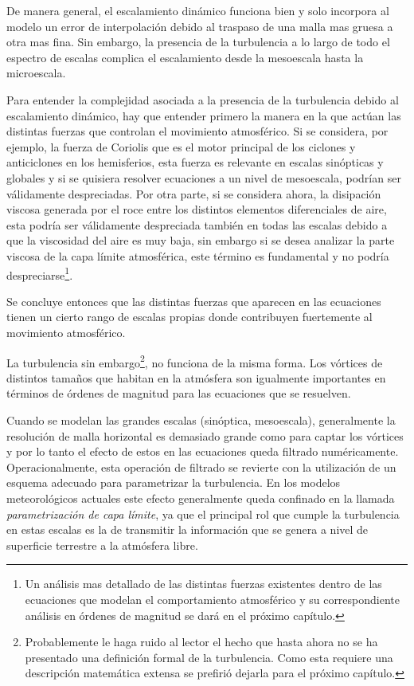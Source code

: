 De manera general, el escalamiento dinámico funciona bien y solo incorpora al modelo un error de interpolación debido al traspaso de una malla mas gruesa a otra mas fina. Sin embargo, la presencia de la turbulencia a lo largo de todo el espectro de escalas complica el escalamiento desde la mesoescala hasta la microescala.

Para entender la complejidad asociada a la presencia de la turbulencia debido al escalamiento dinámico, hay que entender primero la manera en la que actúan las distintas fuerzas que controlan el movimiento atmosférico. Si se considera, por ejemplo, la fuerza de Coriolis que es el motor principal de los ciclones y anticiclones en los hemisferios, esta fuerza es relevante en escalas sinópticas y globales y si se quisiera resolver ecuaciones a un nivel de mesoescala, podrían ser válidamente despreciadas. Por otra parte, si se considera ahora, la disipación viscosa generada por el roce entre los distintos elementos diferenciales de aire, esta podría ser válidamente despreciada también en todas las escalas debido a que la viscosidad del aire es muy baja, sin embargo si se desea analizar la parte viscosa de la capa límite atmosférica, este término es fundamental y no podría despreciarse\footnote{Un análisis mas detallado de las distintas fuerzas existentes dentro de las ecuaciones que modelan el comportamiento atmosférico y su correspondiente análisis en órdenes de magnitud se dará en el próximo capítulo.}. 
 
Se concluye entonces que las distintas fuerzas que aparecen en las ecuaciones tienen un cierto rango de escalas propias donde contribuyen fuertemente al movimiento atmosférico. 

La turbulencia sin embargo\footnote{Probablemente le haga ruido al lector el hecho que hasta ahora no se ha presentado una definición formal de la turbulencia. Como esta requiere una descripción matemática extensa se prefirió dejarla para el próximo capítulo.}, no funciona de la misma forma. Los vórtices de distintos tamaños que habitan en la atmósfera son igualmente importantes en términos de órdenes de magnitud para las ecuaciones que se resuelven.

Cuando se modelan las grandes escalas (sinóptica, mesoescala), generalmente la resolución de malla horizontal es demasiado grande como para captar los vórtices y por lo tanto el efecto de estos en las ecuaciones queda filtrado numéricamente. Operacionalmente, esta operación de filtrado se revierte con la utilización de un esquema adecuado para parametrizar la turbulencia. En los modelos meteorológicos actuales este efecto generalmente queda confinado en la llamada \emph{parametrización de capa límite}, ya que el principal rol que cumple la turbulencia en estas escalas es la de transmitir la información que se genera a nivel de superficie terrestre a la atmósfera libre.

